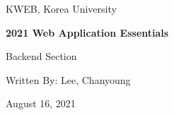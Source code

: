 \begin{titlepage}
    \centering
    \vspace*{35mm}
    \par\vspace{5mm}
    {\large KWEB, Korea University}
    \par\vspace{20mm}
    {\large\bfseries 2021 Web Application Essentials \par\huge Backend Section}
    \par\vspace{30mm}
    {\large Written By: Lee, Chanyoung}
    \par\vspace{30mm}
    {\large August 16, 2021}
\end{titlepage}
